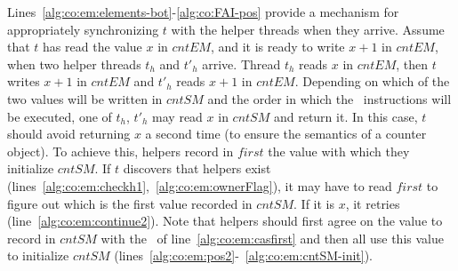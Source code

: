 Lines~\ref{alg:co:em:elements-bot}-\ref{alg:co:FAI-pos} provide a mechanism for appropriately
synchronizing $t$ with the helper threads when they arrive. Assume that $t$ has read the
value $x$ in $\mathit{cntEM}$, and it is ready to write $x+1$ in $\mathit{cntEM}$,
when two helper threads $t_h$ and $t'_h$ arrive.
Thread $t_h$ reads $x$ in $\mathit{cntEM}$, then $t$ writes $x+1$ 
in $\mathit{cntEM}$ and $t'_h$ reads  $x+1$ in $\mathit{cntEM}$.
Depending on which of the two values will be written in $\mathit{cntSM}$
and the order in which the \FAI\ instructions will be executed, 
one of $t_h$, $t'_h$ may read $x$ in $\mathit{cntSM}$ and return it.
% 
In this case, $t$ should avoid returning $x$ a second time (to ensure the semantics of
a counter object). To achieve this, helpers record in $\mathit{first}$ the value with
which they initialize $\mathit{cntSM}$. 
% 
If $t$ discovers that helpers exist (lines~\ref{alg:co:em:checkh1},~\ref{alg:co:em:ownerFlag}), 
it may have to read $\mathit{first}$ to figure out which is the first value recorded
in $\mathit{cntSM}$. If it is $x$, it  retries
(line~\ref{alg:co:em:continue2}). Note that helpers should first agree on the value 
to record in $\mathit{cntSM}$ with the \CAS\ of line~\ref{alg:co:em:casfirst} and then all 
use this value to initialize $\mathit{cntSM}$ (lines~\ref{alg:co:em:pos2}-~\ref{alg:co:em:cntSM-init}).


